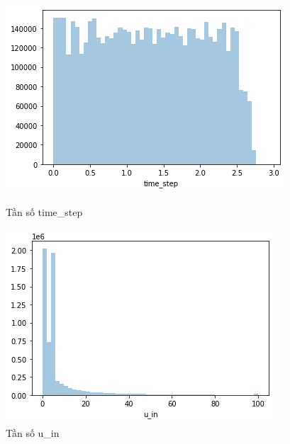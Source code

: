 \documentclass{article}
\begin{document}
\begin{figure}[h!]
  \centering 
  \begin{minipage}[b]{0.2\textwidth}
    \includegraphics[width=\textwidth]{time_step.png}
    \caption{Tần số time\_step}
    \label{fig:time_step}
  \end{minipage}
  \hfill
  \begin{minipage}[b]{0.2\textwidth}
    \includegraphics[width=\textwidth]{u_in.png}
    \caption{Tần số u\_in}
    \label{fig:u_in}
  \end{minipage}
\end{figure}
\end{document}
